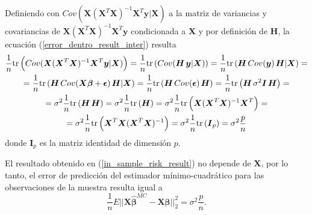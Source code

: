 \documentclass[a4paper,12pt]{report}
\begin{document}
Definiendo con $Cov(\boldsymbol{X}(\boldsymbol{X}^T\boldsymbol{X})^{-1}\boldsymbol{X}^T\boldsymbol{y}|\boldsymbol{X})$ a la matriz de variancias y covariancias de $\boldsymbol{X}(\boldsymbol{X}^T\boldsymbol{X})^{-1}\boldsymbol{X}^T\boldsymbol{y}$ condicionada a $\boldsymbol{X}$ y por definición de $\boldsymbol{H}$, la ecuación (\ref{error_dentro_result_inter}) resulta
\begin{gather}
\nonumber
\frac{1}{n}\text{tr}\left(Cov(\boldsymbol{X}(\boldsymbol{X}^T\boldsymbol{X})^{-1}\boldsymbol{X}^T\boldsymbol{y}|\boldsymbol{X})\right) =
\frac{1}{n}\text{tr}\left(Cov(\boldsymbol{H} \hspace{0.05cm} \boldsymbol{y}|\boldsymbol{X})\right) =
\frac{1}{n}\text{tr}\left(\boldsymbol{H} \hspace{0.05cm} Cov(\boldsymbol{y}) \hspace{0.05cm}\boldsymbol{H}|\boldsymbol{X}\right) = \\
\nonumber
=\frac{1}{n}\text{tr}\left(\boldsymbol{H} \hspace{0.05cm} Cov(\boldsymbol{X}\boldsymbol{\beta}+\boldsymbol{\epsilon}) \hspace{0.05cm}\boldsymbol{H}|\boldsymbol{X}\right) =
\frac{1}{n}\text{tr}\left(\boldsymbol{H} \hspace{0.05cm} Cov(\boldsymbol{\epsilon}) \hspace{0.05cm}\boldsymbol{H}\right) =
\frac{1}{n}\text{tr}\left(\boldsymbol{H} \hspace{0.05cm} \sigma^2\boldsymbol{I} \hspace{0.05cm}\boldsymbol{H}\right) = \\
\nonumber
=\sigma^2\frac{1}{n}\text{tr}\left(\boldsymbol{H} \hspace{0.05cm} \boldsymbol{H}\right) = \sigma^2\frac{1}{n}\text{tr}\left(\boldsymbol{H}\right) = 
\sigma^2\frac{1}{n}\text{tr}\left(\boldsymbol{X}(\boldsymbol{X}^T\boldsymbol{X})^{-1}\boldsymbol{X}^T\right) = \\
\label{in_sample_risk_result}
=\sigma^2\frac{1}{n}\text{tr}\left(\boldsymbol{X}^T\boldsymbol{X}(\boldsymbol{X}^T\boldsymbol{X})^{-1}\right) = 
\sigma^2\frac{1}{n}\text{tr}\left(\boldsymbol{I}_p\right) =
\sigma^2\frac{p}{n}
\end{gather}
donde $\boldsymbol{I}_p$ es la matriz identidad de dimensión $p$.

El resultado obtenido en (\ref{in_sample_risk_result}) no depende de $\boldsymbol{X}$, por lo tanto, el error de predicción del estimador mínimo-cuadrático para las observaciones de la muestra resulta igual a
\begin{equation}
\label{eq: in_sample_risk_final}
\frac{1}{n}E||\boldsymbol{X}\boldsymbol{\hat{\beta}}^{MC}-\boldsymbol{X}\boldsymbol{\beta}||_2^2=\sigma^2\frac{p}{n}.
\end{equation}
\end{document}
